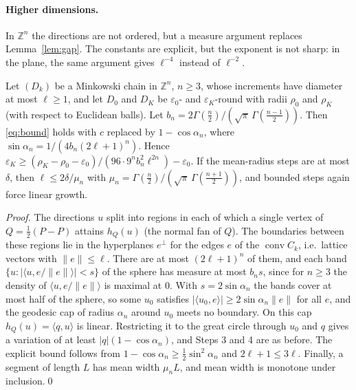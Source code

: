 \documentclass[runningheads]{llncs}
\newcommand{\Z}{\mathbb{Z}}
\newcommand{\conv}{\operatorname{conv}}
\begin{document}
\paragraph{Higher dimensions.} In $\Z^n$ the directions are not ordered, but a measure argument replaces Lemma~\ref{lem:gap}. The constants are explicit, but the exponent is not sharp: in the plane, the same argument gives $\ell^{-4}$ instead of $\ell^{-2}$.

\begin{theorem}\label{thm:zn}
Let $(D_k)$ be a Minkowski chain in $\Z^n$, $n\ge3$, whose increments have diameter at most $\ell\ge1$, and let $D_0$ and $D_K$ be $\varepsilon_0$- and $\varepsilon_K$-round with radii $\rho_0$ and $\rho_K$ (with respect to Euclidean balls). Let $b_n=2\Gamma(\frac n2)/(\sqrt\pi\,\Gamma(\frac{n-1}2))$. Then \eqref{eq:bound} holds with $c$ replaced by $1-\cos\alpha_n$, where $\sin\alpha_n=1/(4b_n(2\ell+1)^n)$. Hence $\varepsilon_K\ge(\rho_K-\rho_0-\varepsilon_0)/(96\cdot9^nb_n^2\ell^{2n})-\varepsilon_0$. If the mean-radius steps are at most $\delta$, then $\ell\le2\delta/\mu_n$ with $\mu_n=\Gamma(\frac n2)/(\sqrt\pi\,\Gamma(\frac{n+1}2))$, and bounded steps again force linear growth.
\end{theorem}
\begin{proof}
The directions $u$ split into regions in each of which a single vertex of $Q=\frac12(P-P)$ attains $h_Q(u)$ (the normal fan of $Q$). The boundaries between these regions lie in the hyperplanes $e^\perp$ for the edges $e$ of the $\conv C_k$, i.e.\ lattice vectors with $\|e\|\le \ell$. There are at most $(2\ell+1)^n$ of them, and each band $\{u:|\langle u,e/\|e\|\rangle|<s\}$ of the sphere has measure at most $b_ns$, since for $n\ge3$ the density of $\langle u,e/\|e\|\rangle$ is maximal at $0$. With $s=2\sin\alpha_n$ the bands cover at most half of the sphere, so some $u_0$ satisfies $|\langle u_0,e\rangle|\ge2\sin\alpha_n\|e\|$ for all $e$, and the geodesic cap of radius $\alpha_n$ around $u_0$ meets no boundary. On this cap $h_Q(u)=\langle q,u\rangle$ is linear. Restricting it to the great circle through $u_0$ and $q$ gives a variation of at least $|q|(1-\cos\alpha_n)$, and Steps 3 and 4 are as before. The explicit bound follows from $1-\cos\alpha_n\ge\frac12\sin^2\alpha_n$ and $2\ell+1\le3\ell$. Finally, a segment of length $L$ has mean width $\mu_nL$, and mean width is monotone under inclusion.\qed
\end{proof}

\end{document}
